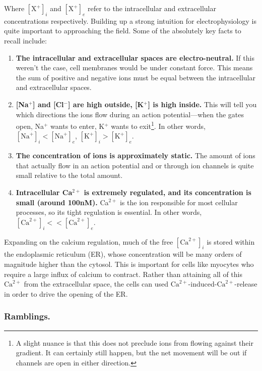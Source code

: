 Where $[\mathrm{X}^+]_i$ and $[\mathrm{X}^+]_e$ refer to the intracellular and extracellular concentrations respectively. Building up a strong intuition for electrophysiology is quite important to approaching the field. Some of the absolutely key facts to recall include:

\begin{enumerate}
\item \textbf{The intracellular and extracellular spaces are electro-neutral.} If this weren't the case, cell membranes would be under constant force. This means the sum of positive and negative ions must be equal between the intracellular and extracellular spaces. 
\item \textbf{[Na$^+$] and [Cl$^-$] are high outside, [K$^+$] is high inside.} This will tell you which directions the ions flow during an action potential---when the gates open, Na$^+$ wants to enter, K$^+$ wants to exit\footnote{A slight nuance is that this does not preclude ions from flowing against their gradient. It can certainly still happen, but the net movement will be out if channels are open in either direction.}. In other words, $[\mathrm{Na}^+]_i < [\mathrm{Na}^+]_e$, $[\mathrm{K}^+]_i > [\mathrm{K}^+]_e$.  
\item \textbf{The concentration of ions is approximately static.} The amount of ions that actually flow in an action potential and or through ion channels is quite small relative to the total amount.
\item \textbf{Intracellular Ca$^{2+}$ is extremely regulated, and its concentration is small (around 100nM).} Ca$^{2+}$ is the ion responsible for most cellular processes, so its tight regulation is essential. In other words, $[\mathrm{Ca}^{2+}]_i << [\mathrm{Ca}^{2+}]_e$. 
\end{enumerate}

Expanding on the calcium regulation, much of the free $[\mathrm{Ca}^{2+}]_i$ is stored within the endoplasmic reticulum (ER), whose concentration will be many orders of magnitude higher than the cytosol. This is important for cells like myocytes who require a large influx of calcium to contract. Rather than attaining all of this $\mathrm{Ca}^{2+}$ from the extracellular space, the cells can used $\mathrm{Ca}^{2+}$-induced-$\mathrm{Ca}^{2+}$-release in order to drive the opening of the ER.\newline

\subsubsection{Ramblings.}

